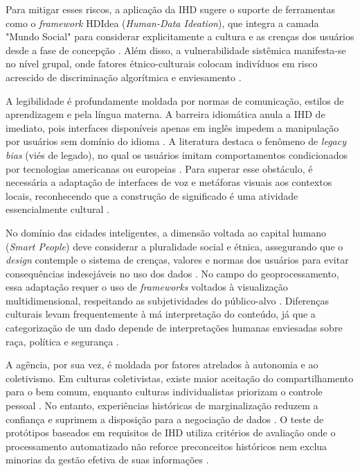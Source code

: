 \documentclass[
	12pt,				%
	oneside,			%
	a4paper,			%
	english,			%
	brazil				%
	]{abntex2ppgsi}
\begin{document}
    Para mitigar esses riscos, a aplicação da IHD sugere o suporte de ferramentas como o \textit{framework} HDIdea (\textit{Human-Data Ideation}), que integra a camada "Mundo Social" para considerar explicitamente a cultura e as crenças dos usuários desde a fase de concepção \cite{Strey2019Human}. Além disso, a vulnerabilidade sistêmica manifesta-se no nível grupal, onde fatores étnico-culturais colocam indivíduos em risco acrescido de discriminação algorítmica e enviesamento \cite{malgieri2020vulnerable}.

    A legibilidade é profundamente moldada por normas de comunicação, estilos de aprendizagem e pela língua materna. A barreira idiomática anula a IHD de imediato, pois interfaces disponíveis apenas em inglês impedem a manipulação por usuários sem domínio do idioma \cite{Barreto2018}. A literatura destaca o fenômeno de \textit{legacy bias} (viés de legado), no qual os usuários imitam comportamentos condicionados por tecnologias americanas ou europeias \cite{DeKreij2024, Friedman2024}. Para superar esse obstáculo, é necessária a adaptação de interfaces de voz e metáforas visuais aos contextos locais, reconhecendo que a construção de significado é uma atividade essencialmente cultural \cite{Alhakamy2021, Haghighati2020, Koesten2021, Coleti2020TR}. 

    No domínio das cidades inteligentes, a dimensão voltada ao capital humano (\textit{Smart People}) deve considerar a pluralidade social e étnica, assegurando que o \textit{design} contemple o sistema de crenças, valores e normas dos usuários para evitar consequências indesejáveis no uso dos dados \cite{Belizario2023Interacao}. No campo do geoprocessamento, essa adaptação requer o uso de \textit{frameworks} voltados à visualização multidimensional, respeitando as subjetividades do público-alvo \cite{Capeleti2024Human, barcellos2022towards}. Diferenças culturais levam frequentemente à má interpretação do conteúdo, já que a categorização de um dado depende de interpretações humanas enviesadas sobre raça, política e segurança \cite{Hornung2015}.

    A agência, por sua vez, é moldada por fatores atrelados à autonomia e ao coletivismo. Em culturas coletivistas, existe maior aceitação do compartilhamento para o bem comum, enquanto culturas individualistas priorizam o controle pessoal \cite{Locoro2020}. No entanto, experiências históricas de marginalização reduzem a confiança e suprimem a disposição para a negociação de dados \cite{Yuan20243615, Lenzi2024, Payne2023, Lockwood2021, Hutton2017}. O teste de protótipos baseados em requisitos de IHD utiliza critérios de avaliação onde o processamento automatizado não reforce preconceitos históricos nem exclua minorias da gestão efetiva de suas informações \cite{Belizario2023Interacao, malgieri2020vulnerable}.
\end{document}
